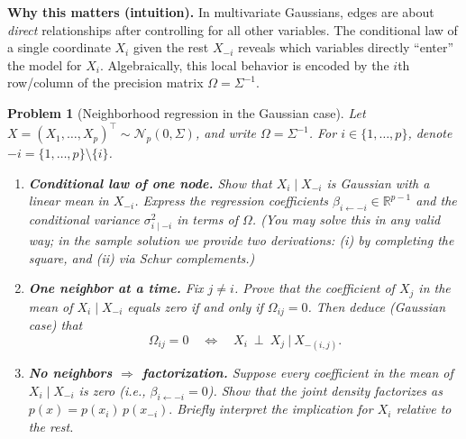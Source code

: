 \documentclass[11pt]{article}
\newtheorem{problem}{Problem}
\begin{document}
\noindent\textbf{Why this matters (intuition).}
In multivariate Gaussians, edges are about \emph{direct} relationships after controlling for all other variables. The conditional law of a single coordinate \(X_i\) given the rest \(X_{-i}\) reveals which variables directly “enter” the model for \(X_i\). Algebraically, this local behavior is encoded by the \(i\)th row/column of the precision matrix \(\Omega=\Sigma^{-1}\).

\begin{problem}[Neighborhood regression in the Gaussian case]
Let \(X=(X_1,\dots,X_p)^\top \sim \mathcal N_p(0,\Sigma)\), and write \(\Omega=\Sigma^{-1}\).
For \(i\in\{1,\dots,p\}\), denote \(-i=\{1,\dots,p\}\setminus\{i\}\).

\begin{enumerate}
\item[(a)] \textbf{Conditional law of one node.}
Show that \(X_i\mid X_{-i}\) is Gaussian with a linear mean in \(X_{-i}\). Express the regression coefficients
\(\beta_{i\leftarrow -i}\in\mathbb{R}^{p-1}\) and the conditional variance \(\sigma^2_{i\mid -i}\) in terms of \(\Omega\).
(You may solve this in any valid way; in the sample solution we provide two derivations:
(i) by completing the square, and (ii) via Schur complements.)
\smallskip

\item[(b)] \textbf{One neighbor at a time.}
Fix \(j\neq i\). Prove that the coefficient of \(X_j\) in the mean of \(X_i \mid X_{-i}\) equals zero if and only if \(\Omega_{ij}=0\).
Then deduce (Gaussian case) that
\[
\Omega_{ij}=0 \quad\Longleftrightarrow\quad X_i\ \perp\ X_j\ \big|\ X_{-(i,j)}.
\]

\item[(c)] \textbf{No neighbors \(\Rightarrow\) factorization.}
Suppose every coefficient in the mean of \(X_i\mid X_{-i}\) is zero (i.e., \(\beta_{i\leftarrow -i}=0\)).
Show that the joint density factorizes as
\(
p(x)=p(x_i)\,p(x_{-i}).
\)
Briefly interpret the implication for \(X_i\) relative to the rest.
\end{enumerate}
\end{problem}
\end{document}
